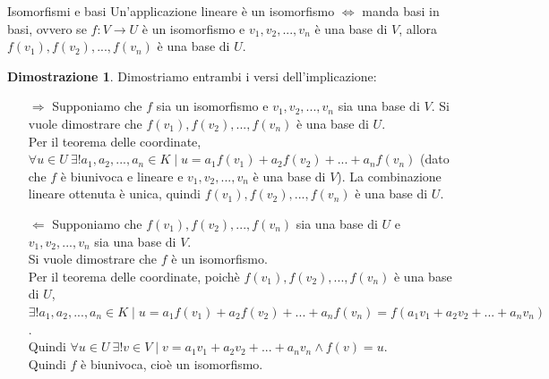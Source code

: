 \documentclass[a4paper]{article}
\theoremstyle{definition}
\newtheorem*{dimm}{Dimostrazione}
\begin{document}
\begin{teo}{Isomorfismi e basi}{}
	Un'applicazione lineare è un isomorfismo $\Leftrightarrow$ manda basi in basi, ovvero se $f: V \rightarrow U$ è un isomorfismo e $v_1, v_2, ..., v_n$ è una base di $V$, allora $f(v_1), f(v_2), ..., f(v_n)$ è una base di $U$.
\end{teo}
\begin{dimm}
	Dimostriamo entrambi i versi dell'implicazione:
	\begin{itemize}
		\item[$\Rightarrow$] Supponiamo che $f$ sia un isomorfismo e $v_1, v_2, ..., v_n$ sia una base di $V$. Si vuole dimostrare che $f(v_1), f(v_2), ..., f(v_n)$ è una base di $U$. \\
		      Per il teorema delle coordinate, $\forall u \in U \ \exists! a_1, a_2, ..., a_n \in K \mid u = a_1f(v_1) + a_2f(v_2) + ... + a_nf(v_n)$ (dato che $f$ è biunivoca e lineare e $v_1, v_2, ..., v_n$ è una base di $V$).
		      La combinazione lineare ottenuta è unica, quindi $f(v_1), f(v_2), ..., f(v_n)$ è una base di $U$.
		\item[$\Leftarrow$] Supponiamo che $f(v_1), f(v_2), ..., f(v_n)$ sia una base di $U$ e $v_1, v_2, ..., v_n$ sia una base di $V$. \\
		      Si vuole dimostrare che $f$ è un isomorfismo. \\
		      Per il teorema delle coordinate, poichè $f(v_1), f(v_2), ..., f(v_n)$ è una base di $U$, $\exists! a_1, a_2, ..., a_n \in K \mid u = a_1f(v_1) + a_2f(v_2) + ... + a_nf(v_n) = f(a_1v_1 + a_2v_2 + ... + a_nv_n)$. \\
		      Quindi $\forall u \in U \ \exists! v \in V \mid v = a_1v_1 + a_2v_2 + ... + a_nv_n \land f(v) = u$. \\
		      Quindi $f$ è biunivoca, cioè un isomorfismo.
	\end{itemize}
\end{dimm}
\end{document}
